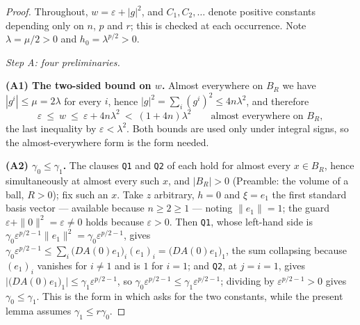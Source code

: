 \begin{proof}
Throughout, $w=\varepsilon+|g|^2$, and $C_1,C_2,\dots$ denote positive
constants depending only on $n$, $p$ and $r$; this is checked at each
occurrence.  Note $\lambda=\mu/2>0$ and $h_0=\lambda^{p/2}>0$.

\emph{Step A: four preliminaries.}

\textbf{(A1) The two-sided bound on $w$.}  Almost everywhere on $B_R$ we have
$|g^i|\le\mu=2\lambda$ for every $i$, hence
$|g|^2=\sum_i(g^i)^2\le 4n\lambda^2$, and therefore
\[
\varepsilon\ \le\ w\ \le\ \varepsilon+4n\lambda^2\ <\ (1+4n)\lambda^2
\qquad\text{almost everywhere on }B_R,
\tag{A.1}
\]
the last inequality by $\varepsilon<\lambda^2$.  Both bounds are used only under
integral signs, so the almost-everywhere form is the form needed.

\textbf{(A2) $\gamma_0\le\gamma_1$.}  The clauses \texttt{Q1} and \texttt{Q2} of
 each hold for almost every $x\in B_R$, hence
simultaneously at almost every such $x$, and $|B_R|>0$ (Preamble: the volume of
a ball, $R>0$); fix such an $x$.  Take $z$ arbitrary, $h=0$ and $\xi=e_1$ the
first standard basis vector --- available because $n\ge2\ge1$ --- noting
$\|e_1\|=1$; the guard
$\varepsilon+\|0\|^2=\varepsilon\ne0$ holds because $\varepsilon>0$.  Then
\texttt{Q1}, whose left-hand side is
$\gamma_0\varepsilon^{p/2-1}\|e_1\|^2=\gamma_0\varepsilon^{p/2-1}$, gives
$\gamma_0\varepsilon^{p/2-1}\le\sum_i\bigl(DA(0)e_1\bigr)_i(e_1)_i
=\bigl(DA(0)e_1\bigr)_1$, the sum collapsing because $(e_1)_i$ vanishes for
$i\ne1$ and is $1$ for $i=1$; and \texttt{Q2}, at $j=i=1$, gives
$\bigl|\bigl(DA(0)e_1\bigr)_1\bigr|\le\gamma_1\varepsilon^{p/2-1}$, so
$\gamma_0\varepsilon^{p/2-1}\le\gamma_1\varepsilon^{p/2-1}$; dividing by
$\varepsilon^{p/2-1}>0$ gives $\gamma_0\le\gamma_1$.  This is the form in which
 asks for the two constants, while the
present lemma assumes $\gamma_1\le r\gamma_0$.


\end{proof}
